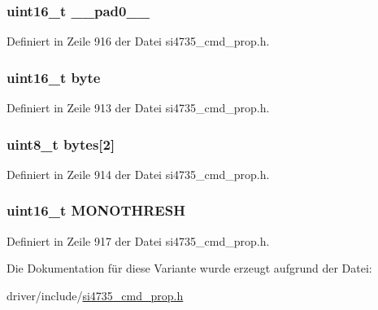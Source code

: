 \subsubsection[{\+\_\+\+\_\+pad0\+\_\+\+\_\+}]{\setlength{\rightskip}{0pt plus 5cm}uint16\+\_\+t \+\_\+\+\_\+pad0\+\_\+\+\_\+}\label{unionfm__blend__multi__mono__thres_a77132c2c26a75f5b8751b235cda23828}


Definiert in Zeile 916 der Datei si4735\+\_\+cmd\+\_\+prop.\+h.

\hypertarget{unionfm__blend__multi__mono__thres_ab0549c1b5ea980a02e7eab77e21fea49}{}
\subsubsection[{byte}]{\setlength{\rightskip}{0pt plus 5cm}uint16\+\_\+t byte}\label{unionfm__blend__multi__mono__thres_ab0549c1b5ea980a02e7eab77e21fea49}


Definiert in Zeile 913 der Datei si4735\+\_\+cmd\+\_\+prop.\+h.

\hypertarget{unionfm__blend__multi__mono__thres_a46e4c05d20a047ec169f60d3167e912e}{}
\subsubsection[{bytes}]{\setlength{\rightskip}{0pt plus 5cm}uint8\+\_\+t bytes\mbox{[}2\mbox{]}}\label{unionfm__blend__multi__mono__thres_a46e4c05d20a047ec169f60d3167e912e}


Definiert in Zeile 914 der Datei si4735\+\_\+cmd\+\_\+prop.\+h.

\hypertarget{unionfm__blend__multi__mono__thres_a5de7498b6512934529d0c6284f120805}{}
\subsubsection[{M\+O\+N\+O\+T\+H\+R\+E\+S\+H}]{\setlength{\rightskip}{0pt plus 5cm}uint16\+\_\+t M\+O\+N\+O\+T\+H\+R\+E\+S\+H}\label{unionfm__blend__multi__mono__thres_a5de7498b6512934529d0c6284f120805}


Definiert in Zeile 917 der Datei si4735\+\_\+cmd\+\_\+prop.\+h.



Die Dokumentation für diese Variante wurde erzeugt aufgrund der Datei\+:\begin{DoxyCompactItemize}
\item 
driver/include/\hyperlink{si4735__cmd__prop_8h}{si4735\+\_\+cmd\+\_\+prop.\+h}\end{DoxyCompactItemize}
